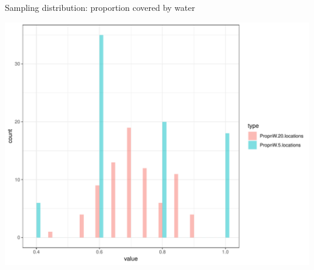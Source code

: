 \documentclass{beamer}\usepackage[]{graphicx}\usepackage[]{color}
\newenvironment{knitrout}{}{} %
\begin{document}
\begin{frame}[fragile]{Sampling distribution: proportion covered by water}




\begin{knitrout}\scriptsize
{}\color{fgcolor}

{\centering \includegraphics[width=1\linewidth]{figure/unnamed-chunk-4-1} 

}



\end{knitrout}

\end{frame}
\end{document}
